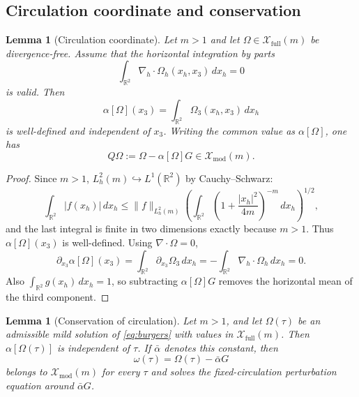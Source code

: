\documentclass[11pt]{amsart}
\theoremstyle{plain}
\newtheorem{lemma}[theorem]{Lemma}
\theoremstyle{definition}
\theoremstyle{remark}
\numberwithin{equation}{section}
\begin{document}
\subsection{Circulation coordinate and conservation}

\begin{lemma}[Circulation coordinate]\label{lem:circulation}
Let \(m>1\) and let
\(\Omega\in\mathcal X_{\mathrm{full}}(m)\) be divergence-free.  Assume that
the horizontal integration by parts
\[
   \int_{\mathbb R^2}\nabla_h\cdot\Omega_h(x_h,x_3)\,dx_h=0
\]
is valid.  Then
\[
   \alpha[\Omega](x_3)
   =
   \int_{\mathbb R^2}\Omega_3(x_h,x_3)\,dx_h
\]
is well-defined and independent of \(x_3\).  Writing the common value as
\(\alpha[\Omega]\), one has
\[
   Q\Omega:=\Omega-\alpha[\Omega]G\in\mathcal X_{\mathrm{mod}}(m).
\]
\end{lemma}

\begin{proof}
Since \(m>1\), \(L^2_h(m)\hookrightarrow L^1(\mathbb R^2)\) by
Cauchy--Schwarz:
\[
   \int_{\mathbb R^2}|f(x_h)|\,dx_h
   \le
   \|f\|_{L^2_h(m)}
   \left(
      \int_{\mathbb R^2}
      \left(1+\frac{|x_h|^2}{4m}\right)^{-m}\,dx_h
   \right)^{1/2},
\]
and the last integral is finite in two dimensions exactly because \(m>1\).
Thus \(\alpha[\Omega](x_3)\) is well-defined.  Using
\(\nabla\cdot\Omega=0\),
\[
   \partial_{x_3}\alpha[\Omega](x_3)
   =
   \int_{\mathbb R^2}\partial_{x_3}\Omega_3\,dx_h
   =
   -\int_{\mathbb R^2}\nabla_h\cdot\Omega_h\,dx_h
   =
   0 .
\]
Also \(\int_{\mathbb R^2}g(x_h)\,dx_h=1\), so subtracting
\(\alpha[\Omega]G\) removes the horizontal mean of the third component.
\end{proof}

\begin{lemma}[Conservation of circulation]\label{lem:circulation-conserved}
Let \(m>1\), and let \(\Omega(\tau)\) be an admissible mild solution of
\eqref{eq:burgers} with values in \(\mathcal X_{\mathrm{full}}(m)\).  Then
\(\alpha[\Omega(\tau)]\) is independent of \(\tau\).  If
\(\bar\alpha\) denotes this constant, then
\[
   \omega(\tau)=\Omega(\tau)-\bar\alpha G
\]
belongs to \(\mathcal X_{\mathrm{mod}}(m)\) for every \(\tau\) and solves the
fixed-circulation perturbation equation around \(\bar\alpha G\).
\end{lemma}
\end{document}
